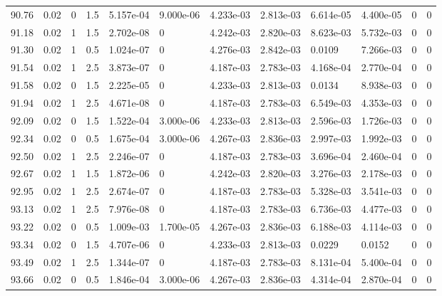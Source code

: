 \documentclass[preview]{standalone}
\begin{document}
{{{{{{{{{{{{{\begin{tabular}{L{1.2cm}C{1.2cm} C{0.3cm}C{0.5cm} C{1.4cm}C{1.4cm} C{1.4cm}C{1.4cm} C{1.6cm}C{1.6cm} C{1.6cm}C{1.6cm}}
  90.76  &  0.02  & 0     & 1.5 &  5.157e-04  & 9.000e-06  &  4.233e-03&   2.813e-03& 6.614e-05 & 4.400e-05   &  0 & 0  \\ 
  91.18  &  0.02  & 1     & 1.5 &  2.702e-08  & 0  &  4.242e-03&   2.820e-03& 8.623e-03 & 5.732e-03   &  0 & 0  \\ 
  91.30  &  0.02  & 1     & 0.5 &  1.024e-07  & 0  &  4.276e-03&   2.842e-03& 0.0109 & 7.266e-03   &  0 & 0  \\ 
  91.54  &  0.02  & 1     & 2.5 &  3.873e-07  & 0  &  4.187e-03&   2.783e-03& 4.168e-04 & 2.770e-04   &  0 & 0  \\ 
  91.58  &  0.02  & 0     & 1.5 &  2.225e-05  & 0  &  4.233e-03&   2.813e-03& 0.0134 & 8.938e-03   &  0 & 0  \\ 
  91.94  &  0.02  & 1     & 2.5 &  4.671e-08  & 0  &  4.187e-03&   2.783e-03& 6.549e-03 & 4.353e-03   &  0 & 0  \\ 
  92.09  &  0.02  & 0     & 1.5 &  1.522e-04  & 3.000e-06  &  4.233e-03&   2.813e-03& 2.596e-03 & 1.726e-03   &  0 & 0  \\ 
  92.34  &  0.02  & 0     & 0.5 &  1.675e-04  & 3.000e-06  &  4.267e-03&   2.836e-03& 2.997e-03 & 1.992e-03   &  0 & 0  \\ 
  92.50  &  0.02  & 1     & 2.5 &  2.246e-07  & 0  &  4.187e-03&   2.783e-03& 3.696e-04 & 2.460e-04   &  0 & 0  \\ 
  92.67  &  0.02  & 1     & 1.5 &  1.872e-06  & 0  &  4.242e-03&   2.820e-03& 3.276e-03 & 2.178e-03   &  0 & 0  \\ 
  92.95  &  0.02  & 1     & 2.5 &  2.674e-07  & 0  &  4.187e-03&   2.783e-03& 5.328e-03 & 3.541e-03   &  0 & 0  \\ 
  93.13  &  0.02  & 1     & 2.5 &  7.976e-08  & 0  &  4.187e-03&   2.783e-03& 6.736e-03 & 4.477e-03   &  0 & 0  \\ 
  93.22  &  0.02  & 0     & 0.5 &  1.009e-03  & 1.700e-05  &  4.267e-03&   2.836e-03& 6.188e-03 & 4.114e-03   &  0 & 0  \\ 
  93.34  &  0.02  & 0     & 1.5 &  4.707e-06  & 0  &  4.233e-03&   2.813e-03& 0.0229 & 0.0152   &  0 & 0  \\ 
  93.49  &  0.02  & 1     & 2.5 &  1.344e-07  & 0  &  4.187e-03&   2.783e-03& 8.131e-04 & 5.400e-04   &  0 & 0  \\ 
  93.66  &  0.02  & 0     & 0.5 &  1.846e-04  & 3.000e-06  &  4.267e-03&   2.836e-03& 4.314e-04 & 2.870e-04   &  0 & 0  \\ 
\hline 
\end{tabular} 

}}}}}}}}}}}}}
\end{document}
